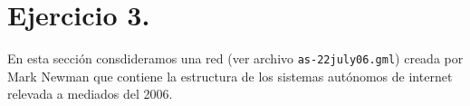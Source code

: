 \section{Ejercicio 3.}

En esta secci\'on consdideramos una red (ver archivo \texttt{as-22july06.gml}) creada por Mark Newman que contiene la estructura de los sistemas aut\'onomos de internet relevada a mediados del 2006.

